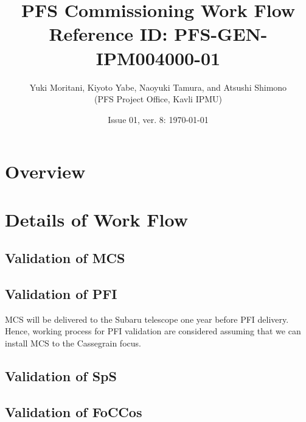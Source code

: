 \documentclass[11pt]{article}
\title{PFS Commissioning Work Flow \\
\large{Reference ID: PFS-GEN-IPM004000-01 }}
\author{Yuki Moritani, Kiyoto Yabe, Naoyuki Tamura, and Atsushi Shimono \\
(PFS Project Office, Kavli IPMU)}
\date{
Issue 01, ver. 8: \today }
\begin{document}
\maketitle
\tableofcontents

\section{Overview}


\section{Details of Work Flow}

\renewcommand{\thesubsubsection}{M-\;\arabic{subsubsection}}
\subsection{Validation of MCS}\label{sec:MCS}





\renewcommand{\thesubsubsection}{P-\;\arabic{subsubsection}}
\subsection{Validation of PFI}\label{sec:PFI}
MCS will be delivered to the Subaru telescope one year before PFI delivery.
Hence, working process for PFI validation are considered assuming that we can install MCS to the Cassegrain focus.










%
%
%

\renewcommand{\thesubsubsection}{S-\;\arabic{subsubsection}}
\subsection{Validation of SpS}\label{sec:SpS}


%

\renewcommand{\thesubsubsection}{F-\;\arabic{subsubsection}}
\subsection{Validation of FoCCos}\label{sec:FoCCoS}


\end{document}
